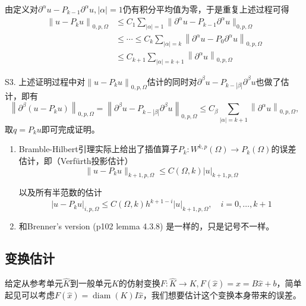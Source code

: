 \begin{pf}
\begin{enumerate}
    由定义对$\partial^\alpha u - P_{k - 1}\partial^\alpha u, |\alpha| = 1$仍有积分平均值为零，于是重复上述过程可得
    \[
      \begin{aligned}
        \left\|u-P_{k} u\right\|_{0, p, \Omega} & \le C_1\sum_{|\alpha| = 1} \|\partial^\alpha u - P_{k - 1}\partial^\alpha u\|_{0, p, \Omega}\\
        & \le \cdots \le C_{k} \sum_{|\alpha|=k}\left\|\partial^{\alpha} u-P_{0} \partial^{\alpha} u\right\|_{0, p, \Omega}\\
        & \le C_{k + 1} \sum_{|\alpha|=k+1}\left\|\partial^{\alpha} u\right\|_{0, p, \Omega}
      \end{aligned}
    \]

    S3. 上述证明过程中对$\left\|u-P_{k} u\right\|_{0, p, \Omega}$估计的同时对$\partial^{\beta} u-P_{k-|\beta|} \partial^{\beta} u$也做了估计，即有
    \[
      \left\|\partial^{\beta} (u-P_{k} u)\right\|_{0, p, \Omega}=\left\|\partial^{\beta} u-P_{k-|\beta|} \partial^{\beta} u\right\|_{0, p, \Omega} \le C_\beta \sum_{|\alpha|=k+1}\left\|\partial^{\alpha} u\right\|_{0, p, \Omega},
    \]
    取$q=P_{k} u$即可完成证明。 
  \end{enumerate}
\end{pf}

\begin{rmk} 
  \quad
  \begin{enumerate}
    \item Bramble-Hilbert引理实际上给出了插值算子$P_k: W^{k, p}(\Omega) \to P_k(\Omega)$的误差估计，即（Verfürth投影估计）
    \[
      \|u-P_ku\|_{k+1, p, \Omega} \le C(\Omega, k)|u|_{k+1, p, \Omega}
    \]

    以及所有半范数的估计
    \[
      |u-P_ku|_{i, p, \Omega} \le C(\Omega, k)h^{k + 1 - i}|u|_{k+1, p, \Omega}, \quad i = 0, \dots, k + 1
    \]

    \item 和Brenner's version (p102 lemma 4.3.8) 是一样的，只是记号不一样。
  \end{enumerate}
\end{rmk}

\subsection{变换估计}

给定从参考单元$\widehat{K}$到一般单元$K$的仿射变换$F: \widehat{K} \to K, F(\widehat{x}) = x = B\widehat{x} + b$，简单起见可以考虑$F(\widehat{x}) = \operatorname{diam}(K) I \widehat{x}$，我们想要估计这个变换本身带来的误差。


